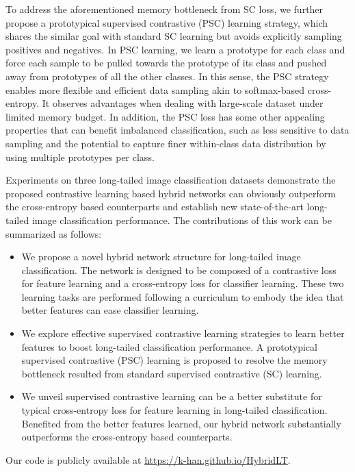\documentclass[final]{cvpr}
\begin{document}
To address the aforementioned memory bottleneck from SC loss, we further propose a prototypical supervised contrastive (PSC) learning strategy, which shares the similar goal with standard SC learning but avoids explicitly sampling positives and negatives. In PSC learning, we learn a prototype for each class and force each sample to be pulled towards the prototype of its class and pushed away from prototypes of all the other classes. In this sense, the PSC strategy enables more flexible and efficient data sampling akin to softmax-based cross-entropy. It observes advantages when dealing with large-scale dataset under limited memory budget. In addition, the PSC loss has some other appealing properties that can benefit imbalanced classification, such as less sensitive to data sampling and the potential to capture finer within-class data distribution by using multiple prototypes per class.



Experiments on three long-tailed image classification datasets demonstrate the proposed contrastive learning based hybrid networks can obviously outperform the cross-entropy based counterparts and establish new state-of-the-art long-tailed image classification performance. The contributions of this work can be summarized as follows:
\begin{itemize}
\itemsep0em 
\item We propose a novel hybrid network structure for long-tailed image classification. The network is designed to be composed of a contrastive loss for feature learning and a cross-entropy loss for classifier learning. These two learning tasks are performed following a curriculum to embody the idea that better features can ease classifier learning. 
\item We explore effective supervised contrastive learning strategies to learn better features to boost long-tailed classification performance. A prototypical supervised contrastive (PSC) learning is proposed to resolve the memory bottleneck resulted from standard supervised contrastive (SC) learning. 
\item We unveil supervised contrastive learning can be a better substitute for typical cross-entropy loss for feature learning in long-tailed classification. Benefited from the better features learned, our hybrid network substantially outperforms the cross-entropy based counterparts.  
\end{itemize}

Our code is publicly available at \url{https://k-han.github.io/HybridLT}.
\end{document}
